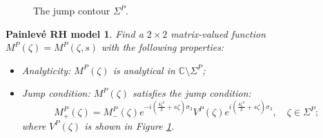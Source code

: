 \documentclass[11pt]{article}
\numberwithin{equation}{section}
\newtheorem{painleve}{Painlev\'e RH model}
\begin{document}
\begin{appendices}
\begin{figure}[h!]
\begin{center}
 		\caption{ \footnotesize { The jump contour $\Sigma^P$.}}
 		\label{Sixrays}
 	\end{center}
 \end{figure}
\FloatBarrier

 \begin{painleve}\label{1modp2}
 	Find  a $2\times2$ matrix-valued function $M^{P}(\zeta)=M^{P}(\zeta,s)$ with the following properties:
 	\begin{itemize}
 		\item Analyticity: $ M^{P}(\zeta)$ is analytical in $\mathbb{C}\setminus \Sigma^{P}$;
 		\item Jump condition: $M^{P}(\zeta)$ satisfies the jump condition:
 		\begin{equation*}
 			M^{P}_+(\zeta)=M^{P}_-(\zeta) e^{-{ i} (\frac{4\zeta^3}{3}+s\zeta)\sigma_3} V^P(\zeta) e^{{ i} (\frac{4\zeta^3}{3}+s\zeta)\sigma_3 }, \quad \zeta \in \Sigma^P;\,
 		\end{equation*}
 		where $V^P(\zeta)$ is shown in Figure \ref{Sixrays}.
 		

\end{itemize}
\end{painleve}
\end{appendices}
\end{document}
